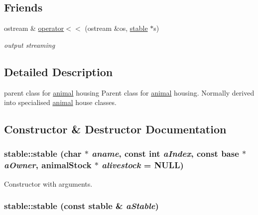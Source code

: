 \subsection*{Friends}
\begin{DoxyCompactItemize}
\item 
ostream \& \hyperlink{classstable_a3372b8131ba5e161ddda6baf3b22d81d}{operator$<$$<$} (ostream \&os, \hyperlink{classstable}{stable} $\ast$s)
\begin{DoxyCompactList}\small\item\em output streaming \item\end{DoxyCompactList}\end{DoxyCompactItemize}


\subsection{Detailed Description}
parent class for \hyperlink{classanimal}{animal} housing Parent class for \hyperlink{classanimal}{animal} housing. Normally derived into specialised \hyperlink{classanimal}{animal} house classes. 

\subsection{Constructor \& Destructor Documentation}
\hypertarget{classstable_a46222d79fa0c2eca30a5dfba0029302c}{
\subsubsection[{stable}]{\setlength{\rightskip}{0pt plus 5cm}stable::stable (char $\ast$ {\em aname}, \/  const int {\em aIndex}, \/  const {\bf base} $\ast$ {\em aOwner}, \/  {\bf animalStock} $\ast$ {\em alivestock} = {\ttfamily NULL})}}
\label{classstable_a46222d79fa0c2eca30a5dfba0029302c}


Constructor with arguments. \hypertarget{classstable_adcfc503ae93e77c418caeda5828ded06}{
\subsubsection[{stable}]{\setlength{\rightskip}{0pt plus 5cm}stable::stable (const {\bf stable} \& {\em aStable})}}
\label{classstable_adcfc503ae93e77c418caeda5828ded06}


